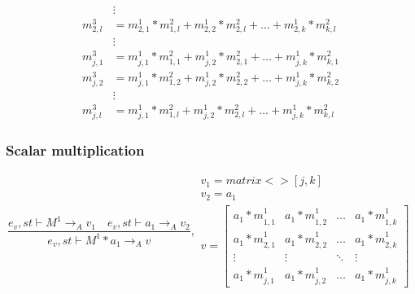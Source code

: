 \begin{minipage}{1.0\textwidth}
\begin{equation*}
\begin{aligned}
&\vdots\\
{ { m }_{ 2,l }^{ 3 } }  &= { { m }_{ 2,1 }^{ 1 } } *{ { m }_{ 1,l }^{ 2 } }+ { { m }_{ 2,2 }^{ 1 } } *{ { m }_{ 2,l }^{ 2 } }+\dots+ { { m }_{ 2,k }^{ 1 } } *{ { m }_{ k,l }^{ 2 } }\\
&\vdots\\
{ { m }_{ j,1 }^{ 3 } }  &= { { m }_{ j,1 }^{ 1 } } *{ { m }_{ 1,1 }^{ 2 } }+ { { m }_{ j,2 }^{ 1 } } *{ { m }_{ 2,1 }^{ 2 } }+\dots+ { { m }_{ j,k }^{ 1 } } *{ { m }_{ k,1 }^{ 2 } }\\
{ { m }_{ j,2 }^{ 3 } }  &= { { m }_{ j,1 }^{ 1 } } *{ { m }_{ 1,2 }^{ 2 } }+ { { m }_{ j,2 }^{ 1 } } *{ { m }_{ 2,2 }^{ 2 } }+\dots+ { { m }_{ j,k }^{ 1 } } *{ { m }_{ k,2 }^{ 2 } }\\
&\vdots\\
{ { m }_{ j,l }^{ 3 } }  &= { { m }_{ j,1 }^{ 1 } } *{ { m }_{ 1,l }^{ 2 } }+ { { m }_{ j,2 }^{ 1 } } *{ { m }_{ 2,l }^{ 2 } }+\dots+ { { m }_{ j,k }^{ 1 } } *{ { m }_{ k,l }^{ 2 } }
\end{aligned}
\end{equation*}
\end{minipage}

\subsubsection{Scalar multiplication}
\begin{equation}
	\frac { { e }_{ v },st\vdash { M }^{ 1 }{ \rightarrow  }_{ A }{ v }_{ 1 }\quad { e }_{ v },st\vdash { a }_{ 1 }{ \rightarrow  }_{ A }{ v }_{ 2 } }{ { e }_{ v },st\vdash { M }^{ 1 }\ast { a }_{ 1 }{ \rightarrow  }_{ A }{ v } } ,\begin{matrix} { v }_{ 1 }=matrix<>[j,k] \\ { v }_{ 2 }={ a }_{ 1 } \\ v=\begin{bmatrix} { { a }_{ 1 }*m }_{ 1,1 }^{ 1 } & { { a }_{ 1 }*m }_{ 1,2 }^{ 1 } & \dots  & { { a }_{ 1 }*m }_{ 1,k }^{ 1 } \\
 { { a }_{ 1 }*m }_{ 2,1 }^{ 1 } & { { a }_{ 1 }*m }_{ 2,2 }^{ 1 } & \dots  & { { a }_{ 1 }*m }_{ 2,k }^{ 1 }  \\ \vdots & \vdots & \ddots & \vdots \\ { { a }_{ 1 }*m }_{ j,1 }^{ 1 } & { { a }_{ 1 }*m }_{ j,2 }^{ 1 } & \dots & { { a }_{ 1 }*m }_{ j,k }^{ 1 } \end{bmatrix} \end{matrix}
\end{equation}

